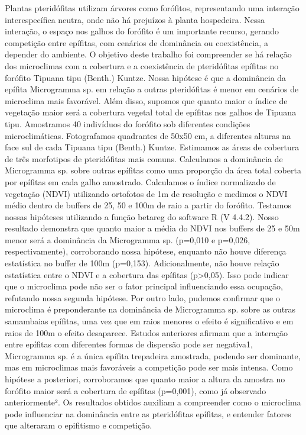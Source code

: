 \documentclass[
]{book}
\begin{document}
Plantas pteridófitas utilizam árvores como forófitos, representando uma interação interespecífica neutra, onde não há prejuízos à planta hospedeira. Nessa interação, o espaço nos galhos do forófito é um importante recurso, gerando competição entre epífitas, com cenários de dominância ou coexistência, a depender do ambiente. O objetivo deste trabalho foi compreender se há relação dos microclimas com a cobertura e a coexistência de pteridófitas epífitas no forófito Tipuana tipu (Benth.) Kuntze. Nossa hipótese é que a dominância da epífita Microgramma sp. em relação a outras pteridófitas é menor em cenários de microclima mais favorável. Além disso, supomos que quanto maior o índice de vegetação maior será a cobertura vegetal total de epífitas nos galhos de Tipuana tipu. Amostramos 40 indivíduos do forófito sob diferentes condições microclimáticas. Fotografamos quadrantes de 50x50 cm, a diferentes alturas na face sul de cada Tipuana tipu (Benth.) Kuntze. Estimamos as áreas de cobertura de três morfotipos de pteridófitas mais comuns. Calculamos a dominância de Microgramma sp. sobre outras epífitas como uma proporção da área total coberta por epífitas em cada galho amostrado. Calculamos o índice normalizado de vegetação (NDVI) utilizando ortofotos de 1m de resolução e medimos o NDVI médio dentro de buffers de 25, 50 e 100m de raio a partir do forófito. Testamos nossas hipóteses utilizando a função betareg do software R (V 4.4.2). Nosso resultado demonstra que quanto maior a média do NDVI nos buffers de 25 e 50m menor será a dominância da Microgramma sp. (p=0,010 e p=0,026, respectivamente), corroborando nossa hipótese, enquanto não houve diferença estatística no buffer de 100m (p=0,153). Adicionalmente, não houve relação estatística entre o NDVI e a cobertura das epífitas (p\textgreater0,05). Isso pode indicar que o microclima pode não ser o fator principal influenciando essa ocupação, refutando nossa segunda hipótese. Por outro lado, pudemos confirmar que o microclima é preponderante na dominância de Microgramma sp. sobre as outras samambaias epífitas, uma vez que em raios menores o efeito é significativo e em raios de 100m o efeito desaparece. Estudos anteriores afirmam que a interação entre epífitas com diferentes formas de dispersão pode ser negativa1, Microgramma sp. é a única epífita trepadeira amostrada, podendo ser dominante, mas em microclimas mais favoráveis a competição pode ser mais intensa. Como hipótese a posteriori, corroboramos que quanto maior a altura da amostra no forófito maior será a cobertura de epífitas (p=0,001), como já observado anteriormente². Os resultados obtidos auxiliam a compreender como o microclima pode influenciar na dominância entre as pteridófitas epífitas, e entender fatores que alteraram o epifitismo e competição.
\end{document}
